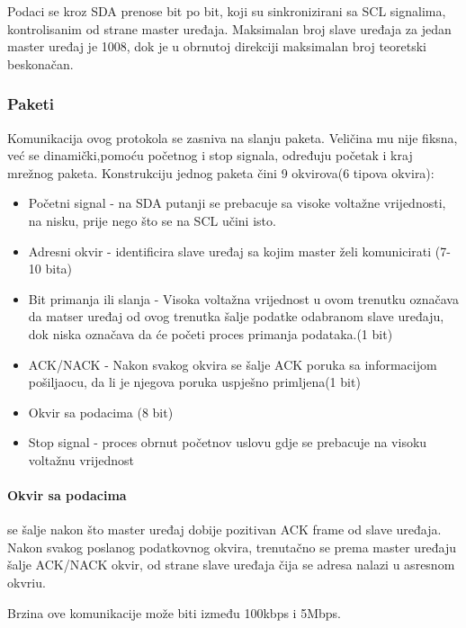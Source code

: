 \documentclass[../Document.tex]{subfiles}
\begin{document}
\noindent Podaci se kroz SDA prenose bit po bit, koji su sinkronizirani sa SCL signalima, kontrolisanim od strane master uređaja. Maksimalan broj slave uređaja za jedan master uređaj je 1008, dok je u obrnutoj direkciji maksimalan broj teoretski beskonačan.

\subsubsection{Paketi}
Komunikacija ovog protokola se zasniva na slanju paketa. Veličina mu nije fiksna, već se dinamički,pomoću početnog i stop signala, određuju početak i kraj mrežnog paketa. Konstrukciju jednog paketa čini 9 okvirova(6 tipova okvira):

\begin{itemize}
    \item Početni signal - na SDA putanji se prebacuje sa visoke voltažne vrijednosti, na nisku, prije nego što se na SCL učini isto.
    \item Adresni okvir - identificira slave uređaj sa kojim master želi komunicirati (7-10 bita)
    \item Bit primanja ili slanja - Visoka voltažna vrijednost u ovom trenutku označava da matser uređaj od ovog trenutka šalje podatke odabranom slave uređaju, dok niska označava da će početi proces primanja podataka.(1 bit)
    \item ACK/NACK - Nakon svakog okvira se šalje ACK poruka sa informacijom pošiljaocu, da li je njegova poruka uspješno primljena(1 bit)
    \item Okvir sa podacima (8 bit)
    \item Stop signal - proces obrnut početnov uslovu gdje se prebacuje na visoku voltažnu vrijednost
\end{itemize}


\paragraph{Okvir sa podacima} se šalje nakon što master uređaj dobije pozitivan ACK frame od slave uređaja. Nakon svakog poslanog podatkovnog okvira, trenutačno se prema master uređaju šalje ACK/NACK okvir, od strane slave uređaja čija se adresa nalazi u asresnom okvriu.\\


\noindent Brzina ove komunikacije može biti između 100kbps i 5Mbps.\\
\end{document}
